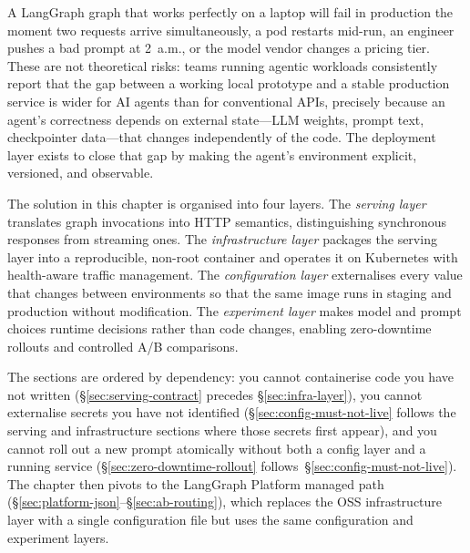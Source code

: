 



A LangGraph graph that works perfectly on a laptop will fail in production
the moment two requests arrive simultaneously, a pod restarts mid-run, an
engineer pushes a bad prompt at 2~a.m., or the model vendor changes a
pricing tier. These are not theoretical risks: teams running agentic
workloads consistently report that the gap between a working local
prototype and a stable production service is wider for AI agents than for
conventional APIs, precisely because an agent's correctness depends on
external state---LLM weights, prompt text, checkpointer data---that changes
independently of the code. The deployment layer exists to close that gap by
making the agent's environment explicit, versioned, and observable.

The solution in this chapter is organised into four layers. The
\emph{serving layer} translates graph invocations into HTTP semantics,
distinguishing synchronous responses from streaming ones. The
\emph{infrastructure layer} packages the serving layer into a reproducible,
non-root container and operates it on Kubernetes with health-aware traffic
management. The \emph{configuration layer} externalises every value that
changes between environments so that the same image runs in staging and
production without modification. The \emph{experiment layer} makes model
and prompt choices runtime decisions rather than code changes, enabling
zero-downtime rollouts and controlled A/B comparisons.

The sections are ordered by dependency: you cannot containerise code you
have not written (\S\ref{sec:serving-contract} precedes
\S\ref{sec:infra-layer}), you cannot externalise secrets you have not
identified (\S\ref{sec:config-must-not-live} follows the serving and
infrastructure sections where those secrets first appear), and you cannot
roll out a new prompt atomically without both a config layer and a running
service (\S\ref{sec:zero-downtime-rollout} follows~\S\ref{sec:config-must-not-live}).
The chapter then pivots to the LangGraph Platform managed path
(\S\ref{sec:platform-json}--\S\ref{sec:ab-routing}), which replaces the OSS
infrastructure layer with a single configuration file but uses the same
configuration and experiment layers.

